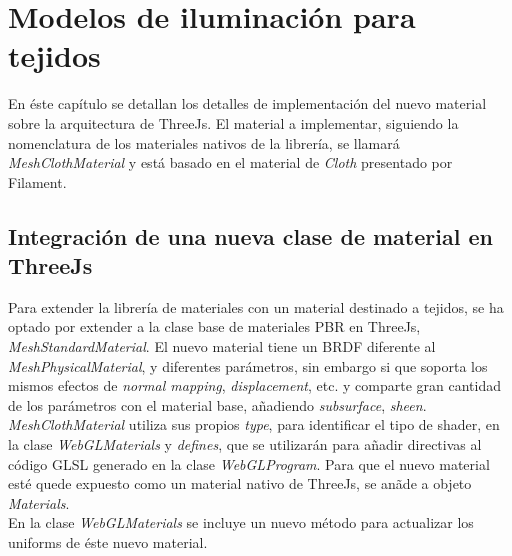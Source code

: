\chapter{Modelos de iluminaci\'on para tejidos}

En \'este cap\'itulo se detallan los detalles de implementaci\'on del nuevo material sobre la arquitectura de ThreeJs.
El material a implementar, siguiendo la nomenclatura de los materiales nativos de la librer\'ia, se llamar\'a
\textit{MeshClothMaterial} y est\'a basado en el material de \textit{Cloth} presentado por Filament.

\section{Integraci\'on de una nueva clase de material en ThreeJs}
Para extender la librer\'ia de materiales con un material destinado a tejidos, se ha optado por extender a la clase base
de materiales PBR en ThreeJs, \textit{MeshStandardMaterial}. El nuevo material tiene un BRDF diferente al \textit{MeshPhysicalMaterial},
y diferentes par\'ametros, sin embargo si que soporta los mismos efectos de \textit{normal mapping}, \textit{displacement}, etc.
y comparte gran cantidad de los par\'ametros con el material base, a\~nadiendo \textit{subsurface}, \textit{sheen}.
\textit{MeshClothMaterial} utiliza sus propios \textit{type}, para identificar el tipo
de shader, en la clase \textit{WebGLMaterials} y \textit{defines}, que se utilizar\'an para a\~nadir directivas al c\'odigo GLSL
generado en la clase \textit{WebGLProgram}. Para que el nuevo material est\'e quede expuesto como un material nativo de ThreeJs,
se an\~ade a objeto \textit{Materials}.\\
En la clase \textit{WebGLMaterials} se incluye un nuevo m\'etodo para actualizar los uniforms de \'este nuevo material.

